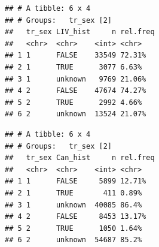 \documentclass[]{article}
\newenvironment{Shaded}{\begin{snugshade}}{\end{snugshade}}
\newcommand{\DataTypeTok}[1]{\textcolor[rgb]{0.13,0.29,0.53}{#1}}
\newcommand{\DecValTok}[1]{\textcolor[rgb]{0.00,0.00,0.81}{#1}}
\newcommand{\KeywordTok}[1]{\textcolor[rgb]{0.13,0.29,0.53}{\textbf{#1}}}
\newcommand{\NormalTok}[1]{#1}
\newcommand{\OperatorTok}[1]{\textcolor[rgb]{0.81,0.36,0.00}{\textbf{#1}}}
\newcommand{\OtherTok}[1]{\textcolor[rgb]{0.56,0.35,0.01}{#1}}
\newcommand{\StringTok}[1]{\textcolor[rgb]{0.31,0.60,0.02}{#1}}
\begin{document}
\begin{verbatim}
## # A tibble: 6 x 4
## # Groups:   tr_sex [2]
##   tr_sex LIV_hist     n rel.freq
##   <chr>  <chr>    <int> <chr>   
## 1 1      FALSE    33549 72.31%  
## 2 1      TRUE      3077 6.63%   
## 3 1      unknown   9769 21.06%  
## 4 2      FALSE    47674 74.27%  
## 5 2      TRUE      2992 4.66%   
## 6 2      unknown  13524 21.07%
\end{verbatim}

\begin{Shaded}
\end{Shaded}

\begin{verbatim}
## # A tibble: 6 x 4
## # Groups:   tr_sex [2]
##   tr_sex Can_hist     n rel.freq
##   <chr>  <chr>    <int> <chr>   
## 1 1      FALSE     5899 12.71%  
## 2 1      TRUE       411 0.89%   
## 3 1      unknown  40085 86.4%   
## 4 2      FALSE     8453 13.17%  
## 5 2      TRUE      1050 1.64%   
## 6 2      unknown  54687 85.2%
\end{verbatim}

\begin{Shaded}
\end{Shaded}
\end{document}
